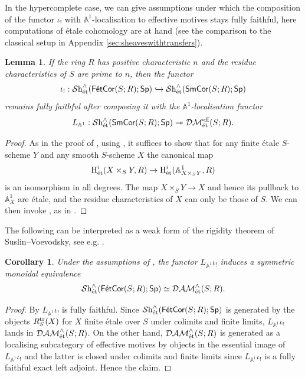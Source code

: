 \documentclass[reqno]{amsart}
\numberwithin{equation}{section}\theoremstyle{thms}
\newtheorem{cor}[equation]{Corollary}
\newtheorem{lem}[equation]{Lemma}
\theoremstyle{defn}
\newcommand{\nH}{\tn{H}}
\newcommand{\bA}{\mathbb{A}}
\newcommand{\tn}[1]{\textnormal{#1}}
\newcommand{\tsf}[1]{\textsf{\textup{#1}}}
\newcommand{\mcal}[1]{\mathcal{#1}}
\newcommand{\sheaves}{\mcal{S}\tn{h}}
\newcommand{\spec}{\tsf{Sp}}
\newcommand{\corsms}[1]{\tsf{SmCor}(S;#1)}
\newcommand{\corfets}[1]{\tsf{FétCor}(S;#1)}
\begin{document}
In the hypercomplete case, we can give assumptions under which the composition of the functor $\iota_!$ with $\bA^1$-localisation to effective motives stays fully faithful, here computations of étale cohomology are at hand (see the comparison to the classical setup in Appendix \ref{sec:sheaveswithtransfers}).

\begin{lem}\label{lem:aonelocalisationetale}
If the ring $R$ has positive characteristic $n$ and the residue characteristics of $S$ are prime to $n$, then the functor 
$$\iota_!: \sheaves_{\tn{ét}}^{\wedge}(\corfets{R};\spec) \hookrightarrow \sheaves_{\tn{ét}}^{\wedge}(\corsms{R};\spec)$$
remains fully faithful after composing it with the $\bA^1$-localisation functor 
$$L_{\bA^1}: \sheaves_{\tn{ét}}^{\wedge}(\corsms{R};\spec) \twoheadrightarrow \mcal{DM}_{\tn{ét}}^{\tn{eff}}(S;R).$$
\end{lem}
\begin{proof}
As in the proof of \cite[Proposition 7.4]{bg23}, using \cite[Proposition 2.2.3]{cd16}, it suffices to show that for any finite étale $S$-scheme $Y$ and any smooth $S$-scheme $X$ the canonical map
$$\nH^i_{\tn{ét}}(X \times_S Y,R) \to \nH^i_{\tn{ét}}(\bA^1_{X \times_S Y},R)$$
is an isomorphism in all degrees. The map $X \times_S Y \to X$ and hence its pullback to $\bA^1_X$ are étale, and the residue characteristics of $X$ can only be those of $S$. We can then invoke \cite[Theorem 1.3.2]{cd16}, as in \cite[Proposition 3.1.7]{cd16}. 
\end{proof}

The following can be interpreted as a weak form of the rigidity theorem of Suslin--Voevodsky, see e.g. \cite[Theorem 4.5.2]{cd16}.

\begin{cor}\label{cor:dametassheaves}
Under the assumptions of , the functor $L_{\bA^1}\iota_!$ induces a symmetric monoidal equivalence 
$$\sheaves_{\tn{ét}}^{\wedge}(\corfets{R};\spec) \simeq \mcal{DAM}^{\wedge}_{\tn{ét}}(S;R).$$
\end{cor}
\begin{proof}
By  $L_{\bA^1}\iota_!$ is fully faithful. Since $\sheaves_{\tn{ét}}^{\wedge}(\corfets{R};\spec)$ is generated by the objects $R_S^{\tn{tr}}(X)$ for $X$ finite étale over $S$ under colimits and finite limits, $L_{\bA^1}\iota_!$ lands in $\mcal{DAM}^{\wedge}_{\tn{ét}}(S;R)$. On the other hand, $\mcal{DAM}^{\wedge}_{\tn{ét}}(S;R)$ is generated as a localising subcategory of effective motives by objects in the essential image of $L_{\bA^1}\iota_!$ and the latter is closed under colimits and finite limits since $L_{\bA^1}\iota_!$ is a fully faithful exact left adjoint. Hence the claim.
\end{proof}
\end{document}
